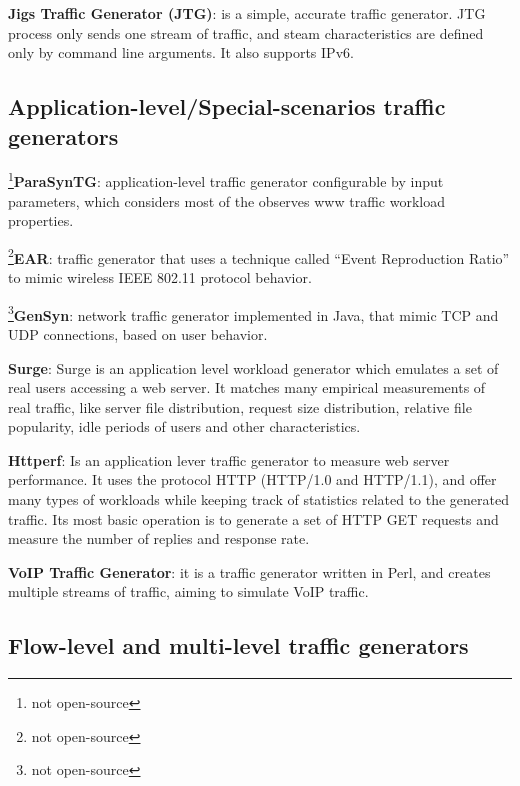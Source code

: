 \textbf{Jigs Traffic Generator (JTG)}\cite{web-jtg}: is a simple, accurate traffic generator. JTG process only sends one stream of traffic, and steam characteristics are defined only by command line arguments. It also supports IPv6. 




\subsection{Application-level/Special-scenarios traffic generators}


\footnote{not open-source}\textbf{ParaSynTG}\cite{parasyntg-paper}: application-level traffic generator configurable by input parameters, which considers most of the observes www traffic workload properties. 


\footnote{not open-source}\textbf{EAR}\cite{ear-paper}: traffic generator that uses a technique called “Event Reproduction Ratio”  to mimic wireless IEEE 802.11 protocol behavior.


\footnote{not open-source}\textbf{GenSyn}\cite{web-gensyn}: network traffic generator implemented in Java, that mimic TCP and UDP connections, based on user behavior. 


\textbf{Surge}\cite{surge-paper}: Surge is an application level workload generator which emulates a set of real users accessing a web server. It matches many empirical measurements of real traffic, like server file distribution, request size distribution, relative file popularity, idle periods of users and other characteristics. 

\textbf{Httperf}\cite{web-httperf}: Is an application lever traffic generator to measure web server performance. It uses the protocol HTTP (HTTP/1.0 and HTTP/1.1), and offer many types of workloads while keeping track of statistics related to the generated traffic. Its most basic operation is to generate a set of HTTP GET requests and measure the number of replies and response rate.  

\textbf{VoIP Traffic Generator}: it is a traffic generator written in Perl, and creates multiple streams of traffic,  aiming to simulate VoIP traffic.


\subsection{Flow-level and multi-level traffic generators}

